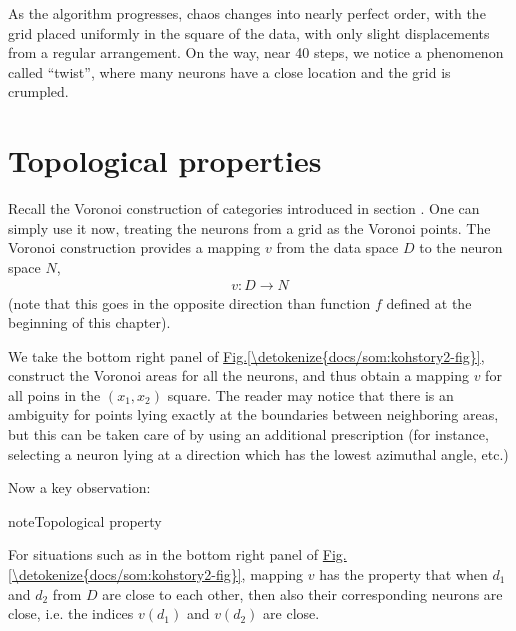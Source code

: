 \documentclass[letterpaper,10pt,english]{jupyterBook}
\begin{document}
\sphinxAtStartPar
As the algorithm progresses, chaos changes into nearly perfect order, with the grid placed uniformly in the square of the data, with only slight displacements from a regular arrangement. On the way, near 40 steps, we notice a phenomenon called “twist”, where many neurons have a close location and the grid is crumpled.


\section{Topological properties}
\label{\detokenize{docs/som:topological-properties}}
\sphinxAtStartPar
Recall the Voronoi construction of categories introduced in section {\hyperref[\detokenize{docs/unsupervised:vor-lab}]{}}. One can simply use it now, treating the neurons from a grid as the Voronoi points. The Voronoi construction provides a mapping \(v\) from the data space \(D\) to the neuron space \(N\),
\begin{equation*}
\begin{split} 
v: D \to N 
\end{split}
\end{equation*}
\sphinxAtStartPar
(note that this goes in the opposite direction than function \(f\) defined at the beginning of this chapter).

\sphinxAtStartPar
We take the bottom right panel of \hyperref[\detokenize{docs/som:kohstory2-fig}]{Fig.\@ \ref{\detokenize{docs/som:kohstory2-fig}}}, construct the Voronoi areas for all the neurons, and thus obtain a mapping \(v\) for all poins in the \((x_1,x_2)\) square. The reader may notice that there is an ambiguity for points lying exactly at the boundaries between neighboring areas, but this can be taken care of by using an additional prescription (for instance, selecting a neuron lying at a direction which has the lowest azimuthal angle, etc.)

\sphinxAtStartPar
Now a key observation:

\begin{sphinxadmonition}{note}{Topological property}

\sphinxAtStartPar
For situations such as in the bottom right panel of \hyperref[\detokenize{docs/som:kohstory2-fig}]{Fig.\@ \ref{\detokenize{docs/som:kohstory2-fig}}}, mapping \(v\) has the property that when \(d_1\) and \(d_2\) from \(D\) are close to each other, then also their corresponding neurons are close, i.e. the indices \(v(d_1)\) and \(v(d_2)\) are close.
\end{sphinxadmonition}
\end{document}
